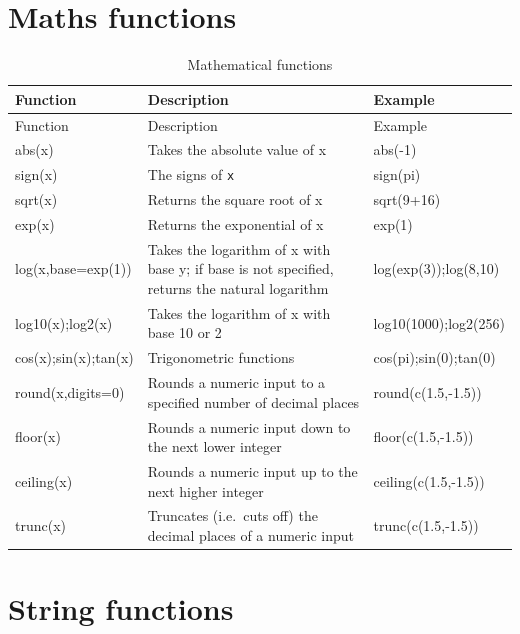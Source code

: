 \documentclass[
]{book}
\begin{document}
\hypertarget{maths-functions}{%
\section{Maths functions}\label{maths-functions}}

\begin{longtable}[]{@{}lll@{}}
\caption{\label{tab:matfuggvenyek}Mathematical functions}\tabularnewline
\toprule
Function & Description & Example\tabularnewline
\midrule
\endfirsthead
\toprule
Function & Description & Example\tabularnewline
\midrule
\endhead
{abs(x)} & Takes the absolute value of x & {abs(-1)}\tabularnewline
{sign(x)} & The signs of \texttt{x} & {sign(pi)}\tabularnewline
{sqrt(x)} & Returns the square root of x & {sqrt(9+16)}\tabularnewline
{exp(x)} & Returns the exponential of x & {exp(1)}\tabularnewline
{log(x,base=exp(1))} & Takes the logarithm of x with base y; if base is not specified, returns the natural logarithm & {log(exp(3));log(8,10)}\tabularnewline
{log10(x);log2(x)} & Takes the logarithm of x with base 10 or 2 & {log10(1000);log2(256)}\tabularnewline
{cos(x);sin(x);tan(x)} & Trigonometric functions & {cos(pi);sin(0);tan(0)}\tabularnewline
{round(x,digits=0)} & Rounds a numeric input to a specified number of decimal places & {round(c(1.5,-1.5))}\tabularnewline
{floor(x)} & Rounds a numeric input down to the next lower integer & {floor(c(1.5,-1.5))}\tabularnewline
{ceiling(x)} & Rounds a numeric input up to the next higher integer & {ceiling(c(1.5,-1.5))}\tabularnewline
{trunc(x)} & Truncates (i.e.~cuts off) the decimal places of a numeric input & {trunc(c(1.5,-1.5))}\tabularnewline
\bottomrule
\end{longtable}

\hypertarget{string-functions}{%
\section{String functions}\label{string-functions}}
\end{document}
